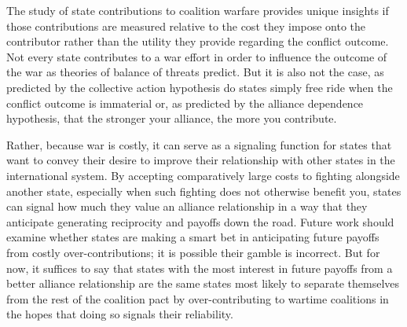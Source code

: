 \documentclass[12pt,letterpaper]{article}
\begin{document}
	The study of state contributions to coalition warfare provides unique insights if those contributions are measured relative to the cost they impose onto the contributor rather than the utility they provide regarding the conflict outcome. Not every state contributes to a war effort in order to influence the outcome of the war as theories of balance of threats predict. But it is also not the case, as predicted by the collective action hypothesis do states simply free ride when the conflict outcome is immaterial or, as predicted by the alliance dependence hypothesis, that the stronger your alliance, the more you contribute.

	Rather, because war is costly, it can serve as a signaling function for states that want to convey their desire to improve their relationship with other states in the international system. By accepting comparatively large costs to fighting alongside another state, especially when such fighting does not otherwise benefit you, states can signal how much they value an alliance relationship in a way that they anticipate generating reciprocity and payoffs down the road. Future work should examine whether states are making a smart bet in anticipating future payoffs from costly over-contributions; it is possible their gamble is incorrect. But for now, it suffices to say that states with the most interest in future payoffs from a better alliance relationship are the same states most likely to separate themselves from the rest of the coalition pact by over-contributing to wartime coalitions in the hopes that doing so signals their reliability.



\end{document}
